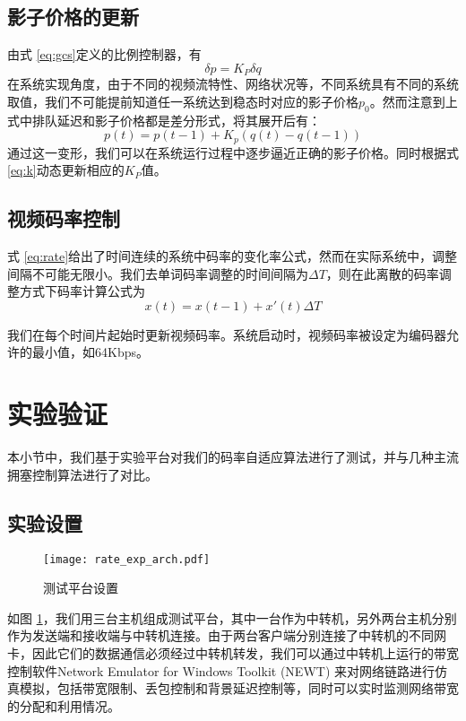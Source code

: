     \subsection{影子价格的更新}
    由式 \ref{eq:gcs}定义的比例控制器，有
    \begin{equation}\label{eq:kpt}
        \delta p = K_P \delta q
    \end{equation}
    在系统实现角度，由于不同的视频流特性、网络状况等，不同系统具有不同的系统取值，我们不可能提前知道任一系统达到稳态时对应的影子价格$p_0$。然而注意到上式中排队延迟和影子价格都是差分形式，将其展开后有：
    \begin{equation}
        p(t) = p(t-1) + K_p(q(t) - q(t-1))
    \end{equation}
    通过这一变形，我们可以在系统运行过程中逐步逼近正确的影子价格。同时根据式\ref{eq:k}动态更新相应的$K_P$值。

    \subsection{视频码率控制}
    式 \ref{eq:rate}给出了时间连续的系统中码率的变化率公式，然而在实际系统中，调整间隔不可能无限小。我们去单词码率调整的时间间隔为$\Delta{T}$，则在此离散的码率调整方式下码率计算公式为
    \begin{equation}
        x(t) = x(t-1) + x'(t) \Delta{T}
    \end{equation}

    我们在每个时间片起始时更新视频码率。系统启动时，视频码率被设定为编码器允许的最小值，如64Kbps。


\section{实验验证}
本小节中，我们基于实验平台对我们的码率自适应算法进行了测试，并与几种主流拥塞控制算法进行了对比。

    \subsection{实验设置}
    
    \begin{figure}[htbp]
      \centering
      \texttt{[image: rate\_exp\_arch.pdf]}
      \caption{测试平台设置}
      \label{fig:rate_exp_arch}
    \end{figure}
    
    如图 \ref{fig:rate_exp_arch}，我们用三台主机组成测试平台，其中一台作为中转机，另外两台主机分别作为发送端和接收端与中转机连接。由于两台客户端分别连接了中转机的不同网卡，因此它们的数据通信必须经过中转机转发，我们可以通过中转机上运行的带宽控制软件Network Emulator for Windows Toolkit (NEWT) 来对网络链路进行仿真模拟，包括带宽限制、丢包控制和背景延迟控制等，同时可以实时监测网络带宽的分配和利用情况。

